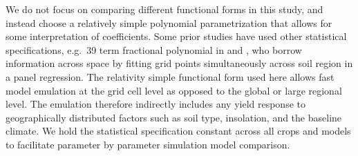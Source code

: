 \documentclass[gmd, manuscript]{copernicus} %
\begin{document}
We do not focus on comparing different functional forms in this study, and instead choose a relatively simple polynomial parametrization that allows for some interpretation of coefficients. 
Some prior studies have used other statistical specifications, e.g.\ 39 term fractional polynomial in \citet{BLANC2015} and \citet{BLANC2017}, who borrow information across space by fitting grid points simultaneously across soil region in a panel regression. 
The relativity simple functional form used here allows fast model emulation at the grid cell level as opposed to the global or large regional level. 
The emulation therefore indirectly includes any yield response to geographically distributed factors such as soil type, insolation, and the baseline climate. 
We hold the statistical specification constant across all crops and models to facilitate parameter by parameter simulation model comparison.

\end{document}
